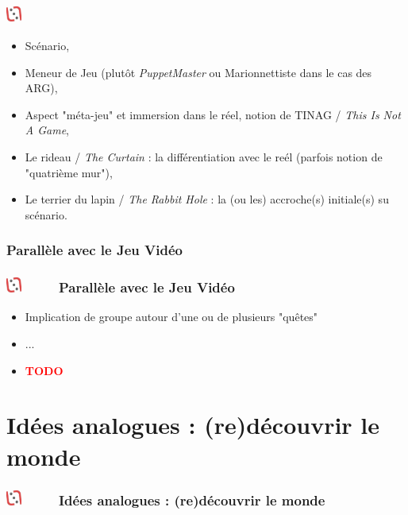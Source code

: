 \documentclass[slidetop,11pt]{beamer}
\def\moreInFrameTitleLeftt{\includegraphics[height=0.5cm]{img/ligueludique-0.png}~~~~~}
\begin{document}
\subsubsection{\sectionPartIIcII} %
\begin{frame}
	\frametitle{\moreInFrameTitleLeftt \sectionPartIIcII }
	\begin{itemize}
		\item Sc{\'e}nario, 
		\item Meneur de Jeu (plut{\^o}t \emph{PuppetMaster} ou Marionnettiste dans le cas des ARG), 
		\item Aspect "m{\'e}ta-jeu" et immersion dans le r{\'e}el, notion de TINAG / \emph{This Is Not A Game}, 
		\item Le rideau / \emph{The Curtain} : la diff{\'e}rentiation avec le re{\'e}l (parfois notion de "quatri{\`e}me mur"), 
		\item Le terrier du lapin / \emph{The Rabbit Hole} : la (ou les) accroche(s) initiale(s) su sc{\'e}nario. 
	\end{itemize}
\end{frame} 

\def\sectionPartIIcIII{Parall{\`e}le avec le Jeu Vid{\'e}o}
\subsubsection{\sectionPartIIcIII} %
\begin{frame}
	\frametitle{\moreInFrameTitleLeftt \sectionPartIIcIII }
	\begin{itemize}
		\item Implication de groupe autour d'une ou de plusieurs "qu{\^e}tes"
		\item[] ...
		\item \textcolor{red}{ \textbf{TODO} }
	\end{itemize}
\end{frame} 


\def\sectionPartIII{Id{\'e}es analogues : (re)d{\'e}couvrir le monde}
\section{\sectionPartIII}
\begin{frame}
	\frametitle{\moreInFrameTitleLeftt \sectionPartIII}
	\tableofcontents[sections=3,currentsection,subsectionstyle=show/shaded/hide] %
\end{frame} 
\end{document}
